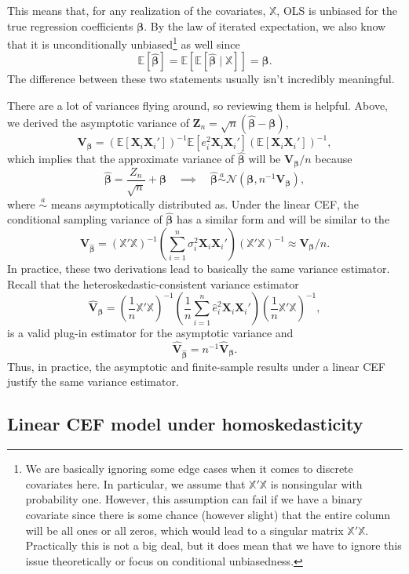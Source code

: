 \documentclass[
  13pt,
  letterpaper,
  DIV=11,
  numbers=noendperiod]{scrreprt}
\newcommand{\mb}{\symbf}
\newcommand{\E}{\mathbb{E}}
\newcommand{\N}{\mathcal{N}}
\newcommand{\X}{\mb{X}}
\newcommand{\Xmat}{\mathbb{X}}
\newcommand{\bfbeta}{\mb{\beta}}
\newcommand{\bhat}{\widehat{\mb{\beta}}}
\theoremstyle{plain}
\theoremstyle{definition}
\theoremstyle{definition}
\theoremstyle{remark}
\begin{document}
This means that, for any realization of the covariates, \(\Xmat\), OLS
is unbiased for the true regression coefficients \(\bfbeta\). By the law
of iterated expectation, we also know that it is unconditionally
unbiased\footnote{We are basically ignoring some edge cases when it
  comes to discrete covariates here. In particular, we assume that
  \(\Xmat'\Xmat\) is nonsingular with probability one. However, this
  assumption can fail if we have a binary covariate since there is some
  chance (however slight) that the entire column will be all ones or all
  zeros, which would lead to a singular matrix \(\Xmat'\Xmat\).
  Practically this is not a big deal, but it does mean that we have to
  ignore this issue theoretically or focus on conditional unbiasedness.}
as well since \[
\E[\bhat] = \E[\E[\bhat \mid \Xmat]] = \bfbeta. 
\] The difference between these two statements usually isn't incredibly
meaningful.

There are a lot of variances flying around, so reviewing them is
helpful. Above, we derived the asymptotic variance of
\(\mb{Z}_{n} = \sqrt{n}(\bhat - \bfbeta)\), \[
\mb{V}_{\bfbeta} = \left( \E[\X_i\X_i'] \right)^{-1}\E[e_i^2\X_i\X_i']\left( \E[\X_i\X_i'] \right)^{-1},
\] which implies that the approximate variance of \(\bhat\) will be
\(\mb{V}_{\bfbeta} / n\) because \[
\bhat = \frac{Z_n}{\sqrt{n}} + \bfbeta \quad\implies\quad \bhat \overset{a}{\sim} \N(\bfbeta, n^{-1}\mb{V}_{\bfbeta}),
\] where \(\overset{a}{\sim}\) means asymptotically distributed as.
Under the linear CEF, the conditional sampling variance of \(\bhat\) has
a similar form and will be similar to the\\
\[
\mb{V}_{\bhat} = \left( \Xmat'\Xmat \right)^{-1}\left( \sum_{i=1}^n \sigma^2_i \X_i\X_i' \right) \left( \Xmat'\Xmat \right)^{-1} \approx \mb{V}_{\bfbeta} / n.
\] In practice, these two derivations lead to basically the same
variance estimator. Recall that the heteroskedastic-consistent variance
estimator \[
\widehat{\mb{V}}_{\bfbeta} = \left( \frac{1}{n} \Xmat'\Xmat \right)^{-1} \left( \frac{1}{n} \sum_{i=1}^n\widehat{e}_i^2\X_i\X_i' \right) \left( \frac{1}{n} \Xmat'\Xmat \right)^{-1},
\] is a valid plug-in estimator for the asymptotic variance and \[
\widehat{\mb{V}}_{\bhat} = n^{-1}\widehat{\mb{V}}_{\bfbeta}.
\] Thus, in practice, the asymptotic and finite-sample results under a
linear CEF justify the same variance estimator.

\subsection{Linear CEF model under
homoskedasticity}\label{linear-cef-model-under-homoskedasticity}
\end{document}
